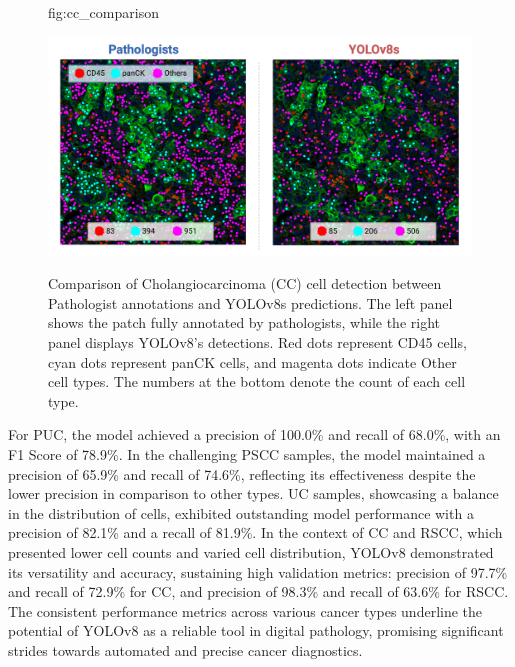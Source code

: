 \documentclass[anon]{midl} %
\begin{document}
\begin{figure}[htbp]
\floatconts
  {fig:cc_comparison}
  {\caption{Comparison of Cholangiocarcinoma (CC) cell detection between Pathologist annotations and YOLOv8s predictions. The left panel shows the patch fully annotated by pathologists, while the right panel displays YOLOv8's detections. Red dots represent CD45 cells, cyan dots represent panCK cells, and magenta dots indicate Other cell types. The numbers at the bottom denote the count of each cell type.}}
  {\includegraphics[width=1\linewidth]{images/3.png}}
\end{figure}

For PUC, the model achieved a precision of 100.0\% and recall of 68.0\%, with an F1 Score of 78.9\%. In the challenging PSCC samples, the model maintained a precision of 65.9\% and recall of 74.6\%, reflecting its effectiveness despite the lower precision in comparison to other types. UC samples, showcasing a balance in the distribution of cells, exhibited outstanding model performance with a precision of 82.1\% and a recall of 81.9\%. In the context of CC and RSCC, which presented lower cell counts and varied cell distribution, YOLOv8 demonstrated its versatility and accuracy, sustaining high validation metrics: precision of 97.7\% and recall of 72.9\% for CC, and precision of 98.3\% and recall of 63.6\% for RSCC. The consistent performance metrics across various cancer types underline the potential of YOLOv8 as a reliable tool in digital pathology, promising significant strides towards automated and precise cancer diagnostics.
\end{document}
